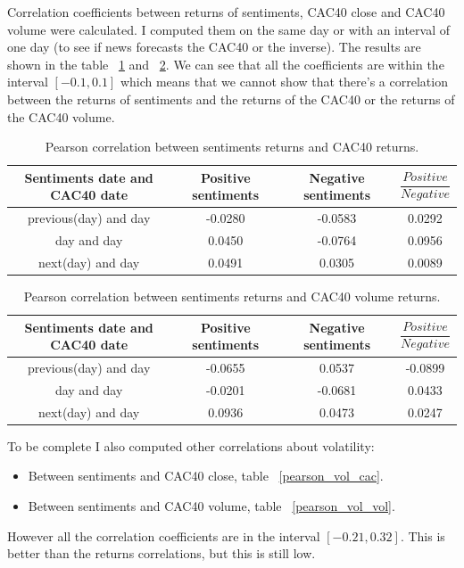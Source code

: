 \documentclass[12pt]{report}
\begin{document}
			Correlation coefficients between returns of sentiments, CAC40 close and CAC40 volume were calculated. I computed them on the same day or with an interval of one day (to see if news forecasts the CAC40 or the inverse). The results are shown in the table ~\ref{pearson_cac} and ~\ref{pearson_volume}. We can see that all the coefficients are within the interval $[-0.1, 0.1]$ which means that we cannot show that there's a correlation between the returns of sentiments and the returns of the CAC40 or the returns of the CAC40 volume.
			
			\begin{table}
			\begin{tabular}{|c | c | c | c|}
				\hline
				Sentiments date and CAC40 date & Positive sentiments & Negative sentiments & $\dfrac{Positive}{Negative}$\\
				\hline
				previous(day) and day & -0.0280 & -0.0583 & 0.0292\\
				\hline
				day and day & 0.0450 & -0.0764 & 0.0956\\
				\hline
				next(day) and day & 0.0491 & 0.0305 & 0.0089\\
				\hline
			\end{tabular}
			
			\caption{Pearson correlation between sentiments returns and CAC40 returns.\label{pearson_cac}}
			\end{table}

			\begin{table}
			\begin{tabular}{|c | c | c | c|}
				\hline
				Sentiments date and CAC40 date & Positive sentiments & Negative sentiments & $\dfrac{Positive}{Negative}$\\
				\hline
				previous(day) and day & -0.0655 & 0.0537 & -0.0899\\
				\hline
				day and day & -0.0201 & -0.0681 & 0.0433\\
				\hline
				next(day) and day & 0.0936 & 0.0473 & 0.0247\\
				\hline
			\end{tabular}
			
			\caption{Pearson correlation between sentiments returns and CAC40 volume returns.\label{pearson_volume}}
			\end{table}

		To be complete I also computed other correlations about volatility:
			\begin{itemize}
				\item Between sentiments and CAC40 close, table ~\ref{pearson_vol_cac}.
				\item Between sentiments and CAC40 volume, table ~\ref{pearson_vol_vol}.
			\end{itemize}
			However all the correlation coefficients are in the interval $[-0.21, 0.32]$. This is better than the returns correlations, but this is still low.
\end{document}
